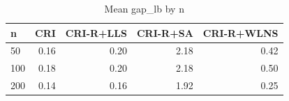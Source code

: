 \begin{table}[htbp]
\centering
\small
\caption{Mean gap\_lb by n}
\label{tab:E5b_ablation_60s_b60_by_n}
\begin{tabular}{lrrrr}
\toprule
n & CRI & CRI-R+LLS & CRI-R+SA & CRI-R+WLNS \\
\midrule
50 & 0.16 & 0.20 & 2.18 & 0.42 \\
100 & 0.18 & 0.20 & 2.18 & 0.50 \\
200 & 0.14 & 0.16 & 1.92 & 0.25 \\
\bottomrule
\end{tabular}
\end{table}
